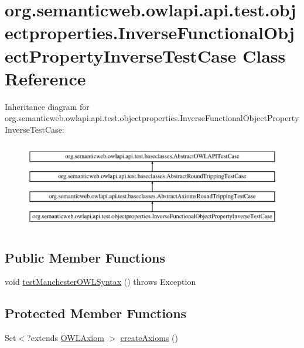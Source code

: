 \hypertarget{classorg_1_1semanticweb_1_1owlapi_1_1api_1_1test_1_1objectproperties_1_1_inverse_functional_object_property_inverse_test_case}{\section{org.\-semanticweb.\-owlapi.\-api.\-test.\-objectproperties.\-Inverse\-Functional\-Object\-Property\-Inverse\-Test\-Case Class Reference}
\label{classorg_1_1semanticweb_1_1owlapi_1_1api_1_1test_1_1objectproperties_1_1_inverse_functional_object_property_inverse_test_case}
}
Inheritance diagram for org.\-semanticweb.\-owlapi.\-api.\-test.\-objectproperties.\-Inverse\-Functional\-Object\-Property\-Inverse\-Test\-Case\-:\begin{figure}[H]
\begin{center}
\leavevmode
\includegraphics[height=3.868739cm]{classorg_1_1semanticweb_1_1owlapi_1_1api_1_1test_1_1objectproperties_1_1_inverse_functional_object_property_inverse_test_case}
\end{center}
\end{figure}
\subsection*{Public Member Functions}
\begin{DoxyCompactItemize}
\item 
void \hyperlink{classorg_1_1semanticweb_1_1owlapi_1_1api_1_1test_1_1objectproperties_1_1_inverse_functional_object_property_inverse_test_case_ab216539cf196b8fd70fd05c1044b45d1}{test\-Manchester\-O\-W\-L\-Syntax} ()  throws Exception 
\end{DoxyCompactItemize}
\subsection*{Protected Member Functions}
\begin{DoxyCompactItemize}
\item 
Set$<$?extends \hyperlink{interfaceorg_1_1semanticweb_1_1owlapi_1_1model_1_1_o_w_l_axiom}{O\-W\-L\-Axiom} $>$ \hyperlink{classorg_1_1semanticweb_1_1owlapi_1_1api_1_1test_1_1objectproperties_1_1_inverse_functional_object_property_inverse_test_case_aa1f8833f4d6aec7616f2b68d0e84edc9}{create\-Axioms} ()
\end{DoxyCompactItemize}


